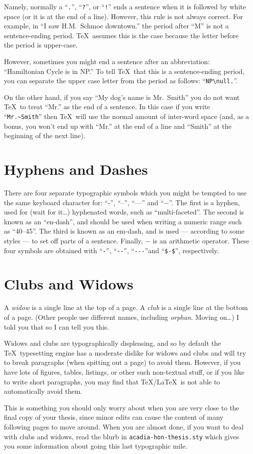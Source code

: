 Namely, normally a ``\verb|.|'', ``\verb|?|'', or ``\verb|!|'' ends a
sentence when it is followed by white space (or it is at the end of a
line).  However, this rule is not always correct.  For example, in
``I saw H.M.~Schmoe downtown.\null'' the period after ``M'' is not a
sentence-ending period.  \TeX\ assumes this is the case because the
letter before the period is upper-case.

However, sometimes you might end a sentence after an abbreviation:
``Hamiltonian Cycle is in NP.''  To tell \TeX\ that this is a
sentence-ending period, you can separate the upper case letter from
the period as follows: ``\verb|NP\null.|''.

On the other hand, if you say ``My dog's name is Mr.~Smith'' you do
not want \TeX\ to treat ``Mr.\null'' as the end of a sentence.  In
this case if you write ``\verb|Mr.~Smith|'' then \TeX\ will use the
normal amount of inter-word space (and, as a bonus, you won't end up
with ``Mr.\null'' at the end of a line and ``Smith'' at the beginning
of the next line).

\section{Hyphens and Dashes}

There are four separate typographic symbols which you might be tempted
to use the same keyboard character for: ``-'', ``--'', ``---'' and ``$-$''.
The first is a hyphen, used for (wait for it\dots) hyphenated words,
such as ``multi-faceted''.  The second is known as an ``en-dash'', and
should be used when writing a numeric range such as ``40--45''.  The
third is known as an em-dash, and is used --- according to some styles
--- to set off parts of a sentence.  Finally, $-$ is an arithmetic
operator.  These four symbols are obtained with ``\verb|-|'',
``\verb|--|'', ``\verb|---|''and ``\verb|$-$|'', respectively.


\section{Clubs and Widows}


A \emph{widow} is a single line at the top of a page.  A \emph{club}
is a single line at the bottom of a page.  (Other people use different
names, including \emph{orphan}.  Moving on\dots)  I told you that so I
can tell you this.

Widows and clubs are typographically displeasing, and so by default
the \TeX\ typesetting engine has a moderate dislike for widows and
clubs and will try to break paragraphs (when spitting out a page) to
avoid them.  However, if you have lots of figures, tables, listings,
or other such non-textual stuff, or if you like to write short
paragraphs, you may find that \TeX/\LaTeX\ is not able to
automatically avoid them.

This is something you should only worry about when you are very close
to the final copy of your thesis, since minor edits can cause the
content of many following pages to move around.  When you are almost
done, if you want to deal with clubs and widows, read the blurb in
\verb|acadia-hon-thesis.sty| which gives you some information about
going this last typographic mile.
